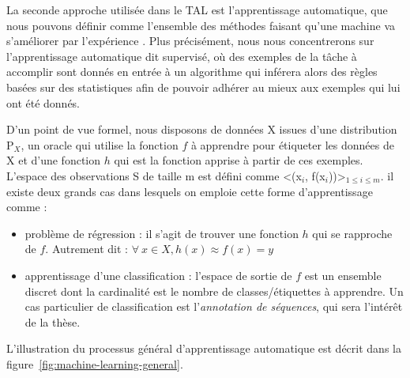 \documentclass[PhD-Yoann-Dupont.tex]{subfiles}
\begin{document}
La seconde approche utilisée dans le TAL est l'apprentissage automatique, que nous pouvons définir comme l'ensemble des méthodes faisant qu'une machine va s'améliorer par l'expérience \citep{cornuejols2011apprentissage}. Plus précisément, nous nous concentrerons sur l'apprentissage automatique dit supervisé, où des exemples de la tâche à accomplir sont donnés en entrée à un algorithme qui inférera alors des règles basées sur des statistiques afin de pouvoir adhérer au mieux aux exemples qui lui ont été donnés.

D'un point de vue formel, nous disposons de données X issues d'une distribution P$_{X}$, un oracle qui utilise la fonction $f$ à apprendre pour étiqueter les données de X et d’une fonction $h$ qui est la fonction apprise à partir de ces exemples. L’espace des observations S de taille m est défini comme <(x$_{i}$, f(x$_{i}$))>$_{1\leq i \leq m}$. il existe deux grands cas dans lesquels on emploie cette forme d’apprentissage comme :
\begin{itemize}
    \item problème de régression : il s’agit de trouver une fonction $h$ qui se rapproche de $f$. Autrement dit : $\forall\ x \in X, h(x) \approx f(x) = y$
    \item apprentissage d’une classification : l’espace de sortie de $f$ est un ensemble discret dont la cardinalité est le nombre de classes/étiquettes à apprendre. Un cas particulier de classification est l'\emph{annotation de séquences}, qui sera l'intérêt de la thèse.
\end{itemize}

L'illustration du processus général d'apprentissage automatique est décrit dans la figure\ \ref{fig:machine-learning-general}.
\end{document}
